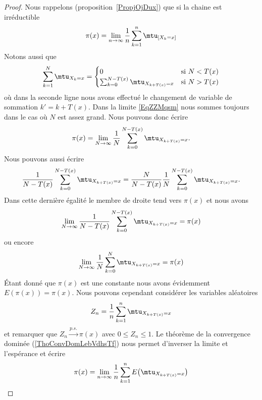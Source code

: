 \begin{proof}
	Nous rappelons (proposition~\ref{PropjOjDux}) que si la chaine est irréductible
	\begin{equation}        \label{EqZZMqsm}
		\pi(x)=\lim_{n\to \infty} \frac{1}{ n }\sum_{k=1}^n\mtu_{[X_k=x]}
	\end{equation}
	Notons aussi que
	\begin{equation}
		\sum_{k=1}^N\mtu_{X_k=x}=\begin{cases}
			0                                      & \text{si } N<T(x) \\
			\sum_{k=0}^{N-T(x)}\mtu_{X_{k+T(x)}=x} & \text{si } N>T(x)
		\end{cases}
	\end{equation}
	où dans la seconde ligne nous avons effectué le changement de variable de sommation \( k'=k+T(x)\). Dans la limite \eqref{EqZZMqsm} nous sommes toujours dans le cas où \( N\) est assez grand. Nous pouvons donc écrire
	\begin{equation}
		\pi(x)=\lim_{N\to \infty} \frac{1}{ N }\sum_{k=0}^{N-T(x)}\mtu_{X_{k+T(x)}=x}.
	\end{equation}
	Nous pouvons aussi écrire
	\begin{equation}
		\frac{1}{ N-T(x) } \sum_{k=0}^{N-T(x)}\mtu_{X_{k+T(x)}=x}=\frac{ N }{ N-T(x) }\frac{1}{ N } \sum_{k=0}^{N-T(x)}\mtu_{X_{k+T(x)}=x}.
	\end{equation}
	Dans cette dernière égalité le membre de droite tend vers \( \pi(x)\) et nous avons
	\begin{equation}
		\lim_{N\to \infty} \frac{1}{ N-T(x) } \sum_{k=0}^{N-T(x)}\mtu_{X_{k+T(x)}=x}=\pi(x)
	\end{equation}
	ou encore
	\begin{equation}
		\lim_{N\to \infty} \frac{1}{ N} \sum_{k=0}^{N}\mtu_{X_{k+T(x)}=x}=\pi(x)
	\end{equation}
	Étant donné que \( \pi(x)\) est une constante nous avons évidemment \( E(\pi(x))=\pi(x)\). Nous pouvons cependant considérer les variables aléatoires
	\begin{equation}
		Z_n=\frac{1}{ n }\sum_{k=1}^n\mtu_{X_{k+T(x)}=x}
	\end{equation}
	et remarquer que \( Z_n\stackrel{p.s.}{\longrightarrow} \pi(x)\) avec \( 0\leq Z_n\leq 1\). Le théorème de la convergence dominée (\ref{ThoConvDomLebVdhsTf}) nous permet d'inverser la limite et l'espérance et écrire
	\begin{subequations}
		\begin{align}
			\pi(x) & =\lim_{n\to \infty} \frac{1}{ n }\sum_{k=1}^nE\big( \mtu_{X_{k+T(x)}=x} \big) \\

\end{align}
\end{subequations}
\end{proof}
